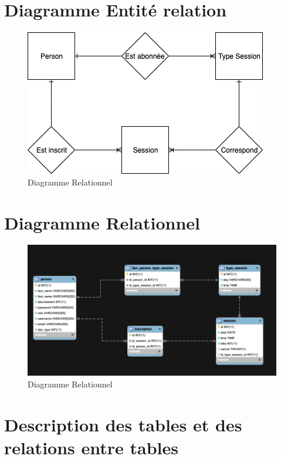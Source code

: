 \section{Diagramme Entité relation}
	\begin{figure}[h!]
       	\includegraphics[width=0.8\linewidth, center]{Figures/Entite-relation.png}
       	\caption{Diagramme Relationnel}
	\end{figure}

\newpage
\section{Diagramme Relationnel}
	\begin{figure}[h!]
       	\includegraphics[width=\linewidth, center]{Figures/Diagramme-Relationnel}
       	 \caption{Diagramme Relationnel}
	\end{figure}
	
	
\section{Description des tables et des relations entre tables}
